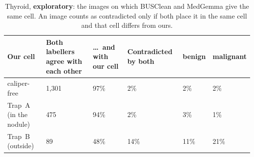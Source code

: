 \begin{table}[H]\centering\scriptsize
\caption{Thyroid, \textbf{exploratory}: the images on which BUSClean and MedGemma give the same cell. An image counts as contradicted only if both place it in the same cell and that cell differs from ours.}\label{tab:s16thycons}
\begin{tabular}{p{3.4cm}p{2.4cm}p{2.0cm}p{2.0cm}p{1.4cm}p{1.4cm}}\toprule
Our cell & Both labellers agree with each other & \ldots\ and with our cell & Contradicted by both & benign & malignant \\\midrule
caliper-free & 1{,}301 & 97\% & 2\% & 2\% & 2\% \\
Trap~A (in the nodule) & 475 & 94\% & 2\% & 3\% & 1\% \\
Trap~B (outside) & 89 & 48\% & 14\% & 11\% & 21\% \\
\bottomrule\end{tabular}
\end{table}
